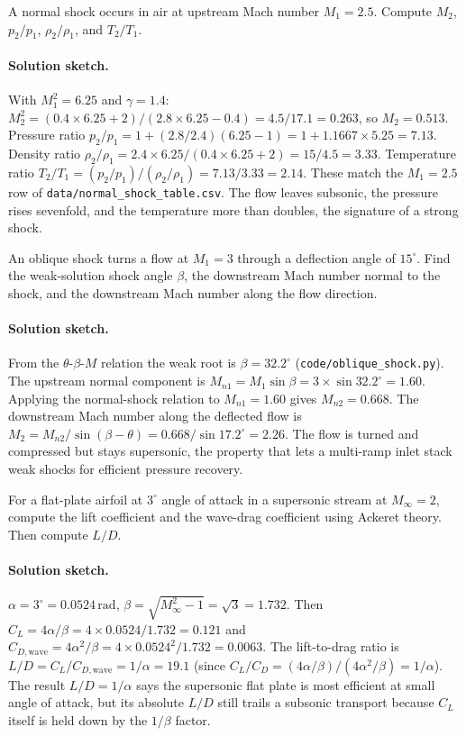\begin{exercise}
A normal shock occurs in air at upstream Mach number $M_1 = 2.5$.
Compute $M_2$, $p_2/p_1$, $\rho_2/\rho_1$, and $T_2/T_1$.
\paragraph{Solution sketch.} With $M_1^2 = 6.25$ and $\gamma = 1.4$:
$M_2^2 = (0.4\times 6.25 + 2)/(2.8\times 6.25 - 0.4) = 4.5/17.1 =
0.263$, so $M_2 = 0.513$. Pressure ratio $p_2/p_1 = 1 +
(2.8/2.4)(6.25 - 1) = 1 + 1.1667\times 5.25 = 7.13$. Density ratio
$\rho_2/\rho_1 = 2.4\times 6.25/(0.4\times 6.25 + 2) = 15/4.5 = 3.33$.
Temperature ratio $T_2/T_1 = (p_2/p_1)/(\rho_2/\rho_1) = 7.13/3.33 =
2.14$. These match the $M_1 = 2.5$ row of
\texttt{data/normal\_shock\_table.csv}. The flow leaves subsonic, the
pressure rises sevenfold, and the temperature more than doubles, the
signature of a strong shock.
\end{exercise}

\begin{exercise}
An oblique shock turns a flow at $M_1 = 3$ through a deflection
angle of $15^{\circ}$. Find the weak-solution shock angle $\beta$,
the downstream Mach number normal to the shock, and the downstream
Mach number along the flow direction.
\paragraph{Solution sketch.} From the $\theta$-$\beta$-$M$ relation
the weak root is $\beta = 32.2^{\circ}$
(\texttt{code/oblique\_shock.py}). The upstream normal component is
$M_{n1} = M_1\sin\beta = 3\times\sin 32.2^{\circ} = 1.60$. Applying
the normal-shock relation to $M_{n1} = 1.60$ gives $M_{n2} = 0.668$.
The downstream Mach number along the deflected flow is $M_2 =
M_{n2}/\sin(\beta - \theta) = 0.668/\sin 17.2^{\circ} = 2.26$. The
flow is turned and compressed but stays supersonic, the property that
lets a multi-ramp inlet stack weak shocks for efficient pressure
recovery.
\end{exercise}

\begin{exercise}
For a flat-plate airfoil at $3^{\circ}$ angle of attack in a
supersonic stream at $M_\infty = 2$, compute the lift coefficient
and the wave-drag coefficient using Ackeret theory. Then compute
$L/D$.
\paragraph{Solution sketch.} $\alpha = 3^{\circ} = 0.0524\,\text{rad}$,
$\beta = \sqrt{M_\infty^2 - 1} = \sqrt{3} = 1.732$. Then
$C_L = 4\alpha/\beta = 4\times 0.0524/1.732 = 0.121$ and
$C_{D,\text{wave}} = 4\alpha^2/\beta = 4\times 0.0524^2/1.732 =
0.0063$. The lift-to-drag ratio is $L/D = C_L/C_{D,\text{wave}} =
1/\alpha = 19.1$ (since $C_L/C_D = (4\alpha/\beta)/(4\alpha^2/\beta) =
1/\alpha$). The result $L/D = 1/\alpha$ says the supersonic flat plate
is most efficient at small angle of attack, but its absolute $L/D$
still trails a subsonic transport because $C_L$ itself is held down by
the $1/\beta$ factor.
\end{exercise}


